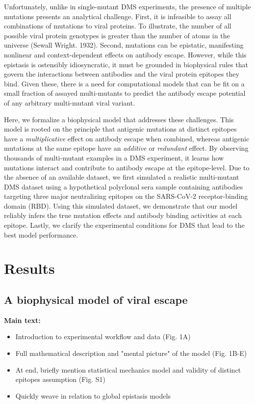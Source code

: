 \documentclass{article}
\begin{document}
Unfortunately, unlike in single-mutant DMS experiments, the presence of multiple mutations presents an analytical challenge.
First, it is infeasible to assay all combinations of mutations to viral proteins.
To illustrate, the number of all possible viral protein genotypes is greater than the number of atoms in the universe (Sewall Wright. 1932).
Second, mutations can be epistatic, manifesting nonlinear and context-dependent effects on antibody escape. 
However, while this epistasis is ostensibly idiosyncratic, it must be grounded in biophysical rules that govern the interactions between antibodies and the viral protein epitopes they bind. 
Given these, there is a need for computational models that can be fit on a small fraction of assayed multi-mutants to predict the antibody escape potential of any arbitrary multi-mutant viral variant.

Here, we formalize a biophysical model that addresses these challenges. 
This model is rooted on the principle that antigenic mutations at distinct epitopes have a \textit{multiplicative} effect on antibody escape when combined, whereas antigenic mutations at the same epitope have an \textit{additive} or \textit{redundant} effect. 
By observing thousands of multi-mutant examples in a DMS experiment, it learns how mutations interact and contribute to antibody escape at the epitope-level. 
Due to the absence of an available dataset, we first simulated a realistic multi-mutant DMS dataset using a hypothetical polyclonal sera sample containing antibodies targeting three major neutralizing epitopes on the SARS-CoV-2 receptor-binding domain (RBD). 
Using this simulated dataset, we demonstrate that our model reliably infers the true mutation effects and antibody binding activities at each epitope.
Lastly, we clarify the experimental conditions for DMS that lead to the best model performance. 

\section*{Results}

\subsection*{A biophysical model of viral escape}

\textbf{Main text:}
\begin{itemize}
	\item Introduction to experimental workflow and data (Fig. 1A)
	\item Full mathematical description and "mental picture" of the model (Fig. 1B-E)
	\item At end, briefly mention statistical mechanics model and validity of distinct epitopes assumption (Fig. S1) 
	\item Quickly weave in relation to global epistasis models
\end{itemize}
\end{document}

